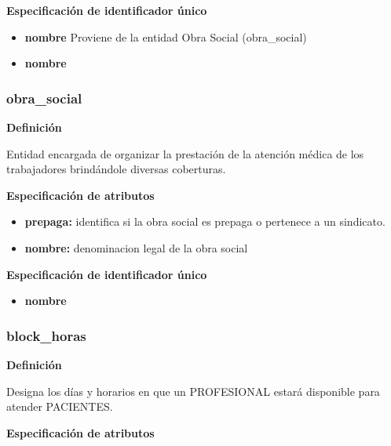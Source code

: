 \documentclass[a4paper,11pt]{article}
\begin{document}
\textbf{Especificación de identificador único}

\begin{itemize}

     \item \textbf{nombre} Proviene de la entidad Obra Social (obra\_social)

     \item \textbf{nombre}

\end{itemize}

\subsubsection{\textbf{obra\_social}}

\textbf{Definición}

Entidad encargada de organizar la prestación de la atención médica de los 
trabajadores brindándole diversas coberturas.

\textbf{Especificación de atributos}

\begin{itemize}

     \item \textbf{prepaga:} identifica si la obra social es prepaga o pertenece a un sindicato.

     \item \textbf{nombre:} denominacion legal de la obra social

\end{itemize}

\textbf{Especificación de identificador único}

\begin{itemize}

     \item \textbf{nombre}

\end{itemize}

\subsubsection{\textbf{block\_horas}}

\textbf{Definición}

Designa los días y horarios en que un PROFESIONAL estará disponible para atender 
PACIENTES.

\textbf{Especificación de atributos}
\end{document}
